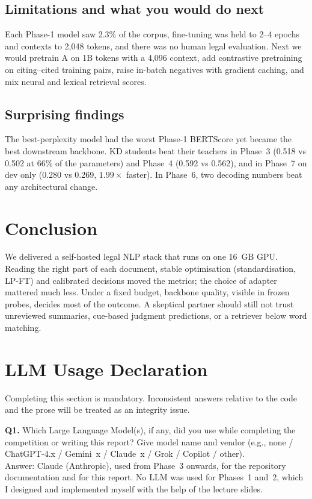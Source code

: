 \documentclass[11pt, oneside]{article}
\newcommand{\A}{\textsf{A}}\newcommand{\B}{\textsf{B}}\newcommand{\C}{\textsf{C}}\newcommand{\D}{\textsf{D}}
\begin{document}
\subsection{Limitations and what you would do next}
Each Phase-1 model saw 2.3\% of the corpus, fine-tuning was held to 2--4 epochs and contexts to 2,048 tokens, and there was no human legal evaluation. Next we would pretrain \A{} on 1B tokens with a 4,096 context, add contrastive pretraining on citing--cited training pairs, raise in-batch negatives with gradient caching, and mix neural and lexical retrieval scores.

\subsection{Surprising findings}
The best-perplexity model had the worst Phase-1 BERTScore yet became the best downstream backbone. KD students beat their teachers in Phase~3 (0.518 vs 0.502 at 66\% of the parameters) and Phase~4 (0.592 vs 0.562), and in Phase~7 on dev only (0.280 vs 0.269, $1.99\times$ faster). In Phase~6, two decoding numbers beat any architectural change.

\section{Conclusion}
We delivered a self-hosted legal NLP stack that runs on one 16~GB GPU. Reading the right part of each document, stable optimisation (standardisation, LP-FT) and calibrated decisions moved the metrics; the choice of adapter mattered much less. Under a fixed budget, backbone quality, visible in frozen probes, decides most of the outcome. A skeptical partner should still not trust unreviewed summaries, cue-based judgment predictions, or a retriever below word matching.

\section*{LLM Usage Declaration}
Completing this section is mandatory. Inconsistent answers relative to the code and the prose will be treated as an integrity issue.
\medskip

\noindent
\textbf{Q1.} Which Large Language Model(s), if any, did you use while completing the competition or writing this report? Give model name and vendor (e.g., none / ChatGPT-4.x / Gemini~x / Claude~x / Grok / Copilot / other). \\[0.6em]
Answer: Claude (Anthropic), used from Phase~3 onwards, for the repository documentation and for this report. No LLM was used for Phases~1 and~2, which I designed and implemented myself with the help of the lecture slides.
\medskip
\end{document}
